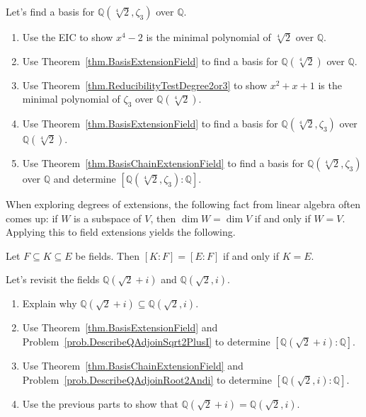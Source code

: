 \begin{problem}\label{prob.BasisQFourthRoot2AndZeta3}
Let's find a basis for $\mathbb{Q}(\sqrt[4]{2},\zeta_3)$ over $\mathbb{Q}$.
\begin{enumerate}
\item Use the EIC to show $x^4-2$ is the minimal polynomial of $\sqrt[4]{2}$ over $\mathbb{Q}$.
\item Use Theorem~\ref{thm.BasisExtensionField} to find a basis for  $\mathbb{Q}(\sqrt[4]{2})$ over $\mathbb{Q}$.
\item Use Theorem~\ref{thm.ReducibilityTestDegree2or3} to show $x^2+x+1$ is the minimal polynomial of $\zeta_3$ over $\mathbb{Q}(\sqrt[4]{2})$.
\item Use Theorem~\ref{thm.BasisExtensionField} to find a basis for  $\mathbb{Q}(\sqrt[4]{2},\zeta_3)$ over $\mathbb{Q}(\sqrt[4]{2})$.
\item Use Theorem~\ref{thm.BasisChainExtensionField} to find a basis for $\mathbb{Q}(\sqrt[4]{2},\zeta_3)$ over $\mathbb{Q}$ and determine $[\mathbb{Q}(\sqrt[4]{2},\zeta_3):\mathbb{Q}]$.

\end{enumerate}
\end{problem}

When exploring degrees of extensions, the following fact from linear algebra often comes up: if $W$ is a subspace of $V$, then $\dim W = \dim V$ if and only if $W = V$. Applying this to field extensions yields the following.

\begin{fact}
Let $F\subseteq K \subseteq E$ be fields. Then $[K:F] = [E:F]$ if and only if $K = E$.
\end{fact}

\begin{problem}
Let's revisit the fields $\mathbb{Q}(\sqrt{2}+i)$ and $\mathbb{Q}(\sqrt{2},i)$.
\begin{enumerate}
\item Explain why $\mathbb{Q}(\sqrt{2}+i)\subseteq \mathbb{Q}(\sqrt{2},i)$.
\item Use Theorem~\ref{thm.BasisExtensionField} and Problem~\ref{prob.DescribeQAdjoinSqrt2PlusI} to determine $[\mathbb{Q}(\sqrt{2}+i):\mathbb{Q}]$.
\item Use Theorem~\ref{thm.BasisChainExtensionField} and Problem~\ref{prob.DescribeQAdjoinRoot2Andi} to determine $[\mathbb{Q}(\sqrt{2},i):\mathbb{Q}]$.
\item Use the previous parts to show that $\mathbb{Q}(\sqrt{2}+i)= \mathbb{Q}(\sqrt{2},i)$.
\end{enumerate}
\end{problem}

